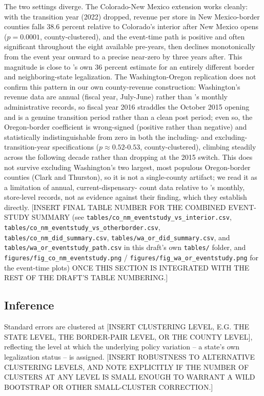 \documentclass[12pt]{article}
\begin{document}
The two settings diverge. The Colorado-New Mexico extension works cleanly: with the transition year (2022)
dropped, revenue per store in New Mexico-border counties falls 38.6 percent relative to Colorado's interior
after New Mexico opens ($p=0.0001$, county-clustered), and the event-time path is positive and often
significant throughout the eight available pre-years, then declines monotonically from the event year
onward to a precise near-zero by three years after. This magnitude is close to
\citeauthor{HansenMillerWeber2020}'s own 36 percent estimate for an entirely different border and
neighboring-state legalization. The Washington-Oregon replication does not confirm this pattern in our own
county-revenue construction: Washington's revenue data are annual (fiscal year, July-June) rather than
\citeauthor{HansenMillerWeber2020}'s monthly administrative records, so fiscal year 2016 straddles the
October 2015 opening and is a genuine transition period rather than a clean post period; even so, the
Oregon-border coefficient is wrong-signed (positive rather than negative) and statistically indistinguishable
from zero in both the including- and excluding-transition-year specifications ($p\approx0.52$-$0.53$,
county-clustered), climbing steadily across the following decade rather than dropping at the 2015 switch.
This does not survive excluding Washington's two largest, most populous Oregon-border counties (Clark and
Thurston), so it is not a single-county artifact; we read it as a limitation of annual, current-dispensary-
count data relative to \citeauthor{HansenMillerWeber2020}'s monthly, store-level records, not as evidence
against their finding, which they establish directly. [INSERT FINAL TABLE NUMBER FOR THE COMBINED
EVENT-STUDY SUMMARY (see \texttt{tables/co\_nm\_eventstudy\_vs\_interior.csv},
\texttt{tables/co\_nm\_eventstudy\_vs\_otherborder.csv}, \texttt{tables/co\_nm\_did\_summary.csv},
\texttt{tables/wa\_or\_did\_summary.csv}, and \texttt{tables/wa\_or\_eventstudy\_path.csv} in this draft's
own \texttt{tables/} folder, and \texttt{figures/fig\_co\_nm\_eventstudy.png} /
\texttt{figures/fig\_wa\_or\_eventstudy.png} for the event-time plots) ONCE THIS SECTION IS INTEGRATED WITH
THE REST OF THE DRAFT'S TABLE NUMBERING.]

\subsection{Inference}
Standard errors are clustered at [INSERT CLUSTERING LEVEL, E.G. THE STATE LEVEL, THE BORDER-PAIR LEVEL, OR
THE COUNTY LEVEL], reflecting the level at which the underlying policy variation -- a state's own
legalization status -- is assigned. [INSERT ROBUSTNESS TO ALTERNATIVE CLUSTERING LEVELS, AND NOTE
EXPLICITLY IF THE NUMBER OF CLUSTERS AT ANY LEVEL IS SMALL ENOUGH TO WARRANT A WILD BOOTSTRAP OR OTHER
SMALL-CLUSTER CORRECTION.]
\end{document}
